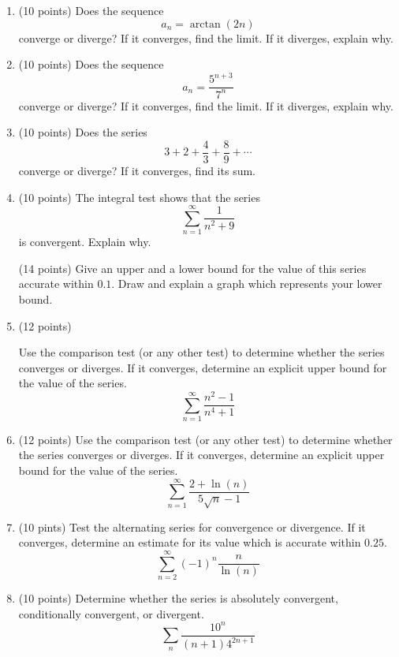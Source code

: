 \documentclass[12pt]{article}
\begin{document}
\begin{enumerate}[(1)]
\item
(10 points) Does the sequence
\[
a_n = \arctan(2n)
\]
converge or diverge? If it converges, find the limit. If it diverges, explain why.
\item

(10 points) Does the sequence
\[
a_n = \frac{5^{n + 3}}{7^n}
\]
converge or diverge? If it converges, find the limit. If it diverges, explain why.
\item (10 points)
Does the series
\[
3 + 2 + \frac{4}{3} + \frac{8}{9} + \cdots
\]
converge or diverge? If it converges, find its sum.

\item
(10 points) 
The integral test shows that the series
\[
\sum_{n = 1}^{\infty} \frac{1}{n^2 + 9}
\]
is convergent. Explain why.

(14 points)
Give an upper and a lower bound for the value of this series accurate within $0.1$.
Draw and explain a graph which represents your lower bound.

\item (12 points)

Use the comparison test (or any other test) to 
determine whether the series converges or diverges. 
If it converges, determine an explicit upper bound for the value of the series.
\[
\sum_{n = 1}^{\infty} \frac{n^2 - 1}{n^4 + 1}
\]
\item (12 points)
Use the comparison test (or any other test) to 
determine whether the series converges or diverges. 
If it converges, determine an explicit upper bound for the value of the series.
\[
\sum_{n = 1}^{\infty} \frac{2 + \ln(n)}{5 \sqrt{n} - 1}
\]

\item (10 pints)
Test the alternating series for convergence or divergence. If it converges, determine
an estimate for its value which is accurate within $0.25$.
\[
\sum_{n = 2}^{\infty} (-1)^n \frac{n}{\ln(n)}
\]
\item (10 points)
Determine whether the series is absolutely convergent, conditionally convergent, or divergent.
\[
\sum_n \frac{ 10^n }{(n + 1) 4^{2n + 1}}
\]

\end{enumerate}
\end{document}
